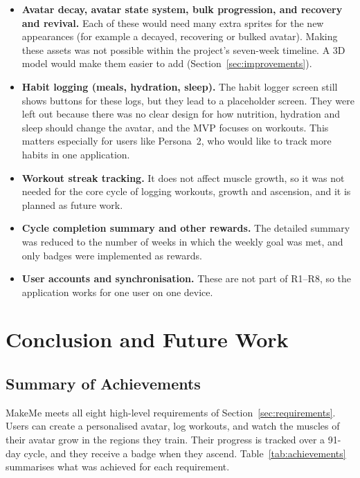 \documentclass[11pt]{article}
\begin{document}
\begin{itemize}
  \item \textbf{Avatar decay, avatar state system, bulk progression, and recovery and revival.} Each of these would need many extra sprites for the new appearances (for example a decayed, recovering or bulked avatar). Making these assets was not possible within the project's seven-week timeline. A 3D model would make them easier to add (Section~\ref{sec:improvements}).
  \item \textbf{Habit logging (meals, hydration, sleep).} The habit logger screen still shows buttons for these logs, but they lead to a placeholder screen. They were left out because there was no clear design for how nutrition, hydration and sleep should change the avatar, and the MVP focuses on workouts. This matters especially for users like Persona~2, who would like to track more habits in one application.
  \item \textbf{Workout streak tracking.} It does not affect muscle growth, so it was not needed for the core cycle of logging workouts, growth and ascension, and it is planned as future work.
  \item \textbf{Cycle completion summary and other rewards.} The detailed summary was reduced to the number of weeks in which the weekly goal was met, and only badges were implemented as rewards.
  \item \textbf{User accounts and synchronisation.} These are not part of R1--R8, so the application works for one user on one device.
\end{itemize}




\section{Conclusion and Future Work}

\subsection{Summary of Achievements}

MakeMe meets all eight high-level requirements of Section~\ref{sec:requirements}. Users can create a personalised avatar, log workouts, and watch the muscles of their avatar grow in the regions they train. Their progress is tracked over a 91-day cycle, and they receive a badge when they ascend. Table~\ref{tab:achievements} summarises what was achieved for each requirement.
\end{document}
